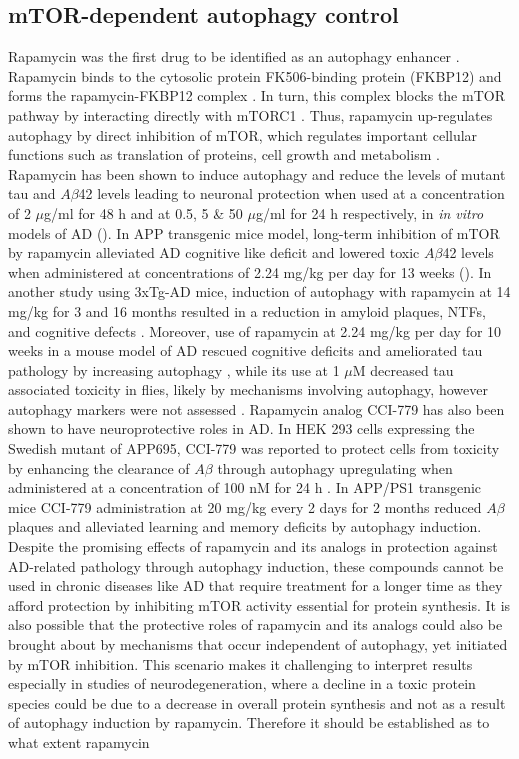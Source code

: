 \subsection{mTOR-dependent autophagy control}
Rapamycin was the first drug to be identified as an autophagy enhancer \citep{Blommaart1995,Noda1998}. Rapamycin binds to the cytosolic protein FK506-binding protein (FKBP12) and forms the rapamycin-FKBP12 complex \citep{Cardenas1995}. In turn, this complex blocks the mTOR pathway by interacting directly with mTORC1 \citep{Cardenas1995,Lorenz1995}. Thus, rapamycin up-regulates autophagy by direct inhibition of mTOR, which regulates important cellular functions such as translation of proteins, cell growth and metabolism \citep{Laplante2012,Polak2009}. Rapamycin has been shown to induce autophagy and reduce the levels of mutant tau and $A\beta$42 levels leading to neuronal protection when used at a concentration of 2 $\mu$g/ml for 48 h \citep{Berger2006} and at 0.5, 5 \& 50 $\mu$g/ml for 24 h \citep{Caccamo2010} respectively, in \textit{in vitro} models of AD (). In APP transgenic mice model, long-term inhibition of mTOR by rapamycin alleviated AD cognitive like deficit and lowered toxic $A\beta$42 levels when administered at concentrations of 2.24 mg/kg per day for 13 weeks \citep{Spilman2010} (). In another study using 3xTg-AD mice, induction of autophagy with rapamycin at 14 mg/kg for 3 and 16 months resulted in a reduction in amyloid plaques, NTFs, and cognitive defects  \citep{Majumder2011}. Moreover, use of rapamycin at 2.24 mg/kg per day for 10 weeks in a mouse model of AD rescued cognitive deficits and ameliorated tau pathology by increasing autophagy \citep{Caccamo2010}, while its use at 1 $\mu$M decreased tau associated toxicity in flies, likely by mechanisms involving autophagy, however autophagy markers were not assessed \citep{Berger2006}. Rapamycin analog CCI-779 has also been shown to have neuroprotective roles in AD. In HEK 293 cells expressing the Swedish mutant of APP695, CCI-779 was reported to protect cells from toxicity by enhancing the clearance of $A\beta$  through autophagy upregulating when administered at a concentration of 100 nM for 24 h \citep{Jiang2014a}. In APP/PS1 transgenic mice CCI-779 administration at 20 mg/kg every 2 days for 2 months reduced $A\beta$ plaques and alleviated learning and memory deficits \citep{Jiang2014a} by autophagy induction. Despite the promising effects of rapamycin and its analogs in protection against AD-related pathology through autophagy induction, these compounds cannot be used in chronic diseases like AD that require treatment for a longer time as they afford protection  by inhibiting mTOR activity essential for protein synthesis. It is also possible that the protective roles of rapamycin and its analogs could also be brought about by mechanisms that occur independent of autophagy, yet initiated by mTOR inhibition. This scenario makes it challenging to interpret results especially in studies of neurodegeneration, where a decline in a toxic protein species could be due to a decrease in overall protein synthesis and not as a result of autophagy induction by rapamycin. Therefore it should be established as to what extent rapamycin 